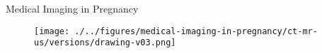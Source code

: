 {
\begin{frame}{Medical Imaging in Pregnancy}
      \begin{figure}
        \centering
        \texttt{[image: ./../figures/medical-imaging-in-pregnancy/ct-mr-us/versions/drawing-v03.png]}
      \end{figure}
\end{frame}
}




